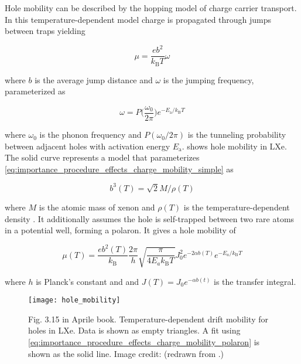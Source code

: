 Hole mobility can be described by the hopping model of charge carrier transport.  In this temperature-dependent model charge is
propagated through jumps between traps yielding

\begin{equation}
\mu = \frac{e b^2}{k_{\mathrm{B}} T} \omega
\label{eq:importance_procedure_effects_charge_mobility_simple}
\end{equation}

\noindent where $b$ is the average jump distance and $\omega$ is the jumping frequency, parameterized as

\begin{equation}
\omega = P \Big( \frac{\omega_0}{2 \pi} \Big) e^{-E_{\mathrm{a}} / k_{\mathrm{B}} T}
\end{equation}

\noindent where $\omega_0$ is the phonon frequency and $P(\omega_0 / 2 \pi)$ is the tunneling probability between adjacent holes with
activation energy $E_{\mathrm{a}}$.   shows hole mobility in
LXe.  The solid curve represents a model that parameterizes \eqref{eq:importance_procedure_effects_charge_mobility_simple} as

\begin{equation}
b^3(T) = \sqrt{2} M / \rho (T)
\end{equation}

\noindent where $M$ is the atomic mass of xenon and $\rho (T)$ is the temperature-dependent density .  It
additionally assumes the hole is self-trapped between two rare atoms in a potential well, forming a polaron.  It gives a hole mobility of

\begin{equation}
\mu (T) = \frac{e b^2 (T)}{k_{\mathrm{B}}} \frac{2 \pi}{h} \sqrt{\frac{\pi}{4 E_a k_{\mathrm{B}} T}} J_0^2
e^{-2 \alpha b(T)} e^{-E_a / k_{\mathrm{B}} T}
\label{eq:importance_procedure_effects_charge_mobility_polaron}
\end{equation}

\noindent where $h$ is Planck's constant and and $J(T) = J_0 e^{-\alpha b(t)}$ is the transfer integral.

\begin{figure}
\centering
\texttt{[image: hole\_mobility]}
\caption{Fig. 3.15 in Aprile book.  Temperature-dependent drift mobility for holes in LXe.  Data is shown as empty triangles.  A fit
using \eqref{eq:importance_procedure_effects_charge_mobility_polaron} is shown as the solid line.  Image credit: 
(redrawn from .)}
\label{fig:importance_procedure_effects_charge_hole_mobility}
\end{figure}

